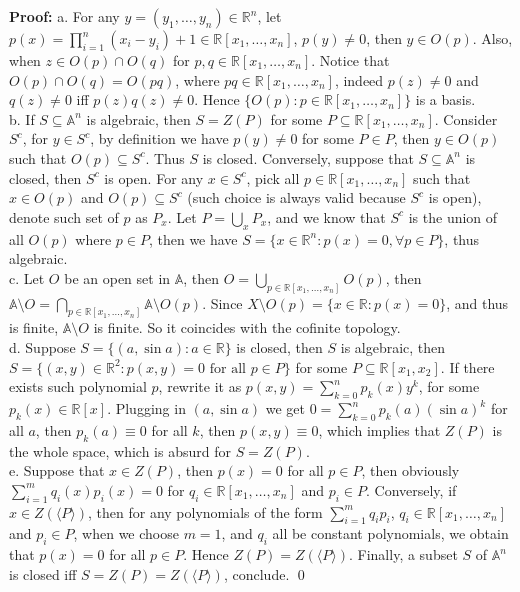 \documentclass[12pt]{article}
\begin{document}
\textbf{Proof:} a. For any $y=(y_{1}, \dots, y_{n})\in\mathbb{R}^{n}$, let $p(x)=\prod_{i=1}^{n}(x_{i}-y_{i})+1\in\mathbb{R}[x_{1}, \dots, x_{n}]$, $p(y)\neq 0$, then $y\in O(p)$. Also, when $z\in O(p)\cap O(q)$ for $p,q\in\mathbb{R}[x_{1}, \dots, x_{n}]$. Notice that $O(p)\cap O(q)=O(pq)$, where $pq\in\mathbb{R}[x_{1}, \dots, x_{n}]$, indeed $p(z)\neq 0$ and $q(z)\neq 0$ iff $p(z)q(z)\neq 0$. Hence $\{O(p): p\in\mathbb{R}[x_{1}, \dots, x_{n}]\}$ is a basis. \\
\indent b. If $S\subseteq\mathbb{A}^{n}$ is algebraic, then $S=Z(P)$ for some $P\subseteq\mathbb{R}[x_{1}, \dots, x_{n}]$. Consider $S^{c}$, for $y\in S^{c}$, by definition we have $p(y)\neq 0$ for some $P\in P$, then $y\in O(p)$ such that $O(p)\subseteq S^{c}$. Thus $S$ is closed. Conversely, suppose that $S\subseteq\mathbb{A}^{n}$ is closed, then $S^{c}$ is open. For any $x\in S^{c}$, pick all $p\in\mathbb{R}[x_{1}, \dots, x_{n}]$ such that $x\in O(p)$ and $O(p)\subseteq S^{c}$ (such choice is always valid because $S^{c}$ is open), denote such set of $p$ as $P_{x}$. Let $P=\bigcup_{x}P_{x}$, and we know that $S^{c}$ is the union of all $O(p)$ where $p\in P$, then we have $S=\{x\in\mathbb{R}^{n}: p(x)=0,\forall p\in P\}$, thus algebraic. \\
\indent c. Let $O$ be an open set in $\mathbb{A}$, then $O=\bigcup_{p\in\mathbb{R}[x_{1}, \dots, x_{n}]} O(p)$, then $\mathbb{A}\setminus O=\bigcap_{p\in\mathbb{R}[x_{1}, \dots, x_{n}]}\mathbb{A}\setminus O(p)$. Since $X\setminus O(p)=\{x\in\mathbb{R}: p(x)=0\}$, and thus is finite, $\mathbb{A}\setminus O$ is finite. So it coincides with the cofinite topology. \\
\indent d. Suppose $S=\{(a,\sin a): a\in\mathbb{R}\}$ is closed, then $S$ is algebraic, then $S=\{(x,y)\in\mathbb{R}^{2}: p(x,y)=0\text{ for all } p\in P\}$ for some $P\subseteq\mathbb{R}[x_{1}, x_{2}]$. If there exists such polynomial $p$, rewrite it as $p(x,y)=\sum\limits_{k=0}^{n}p_{k}(x)y^{k}$, for some $p_{k}(x)\in\mathbb{R}[x]$. Plugging in $(a, \sin a)$ we get $0=\sum\limits_{k=0}^{n}p_{k}(a)(\sin a)^{k}$ for all $a$, then $p_{k}(a)\equiv 0$ for all $k$, then $p(x,y)\equiv 0$, which implies that $Z(P)$ is the whole space, which is absurd for $S=Z(P)$. \\
\indent e. Suppose that $x\in Z(P)$, then $p(x)=0$ for all $p\in P$, then obviously $\sum_{i=1}^{m}q_{i}(x)p_{i}(x)=0$ for $q_{i}\in\mathbb{R}[x_{1}, \dots, x_{n}]$ and $p_{i}\in P$. Conversely, if $x\in Z(\langle P\rangle)$, then for any polynomials of the form $\sum_{i=1}^{m}q_{i}p_{i}$, $q_{i}\in\mathbb{R}[x_{1}, \dots, x_{n}]$ and $p_{i}\in P$, when we choose $m=1$, and $q_{i}$ all be constant polynomials, we obtain that $p(x)=0$ for all $p\in P$. Hence $Z(P)=Z(\langle P\rangle)$. Finally, a subset $S$ of $\mathbb{A}^{n}$ is closed iff $S=Z(P)=Z(\langle P\rangle )$, conclude. \qed
\end{document}
